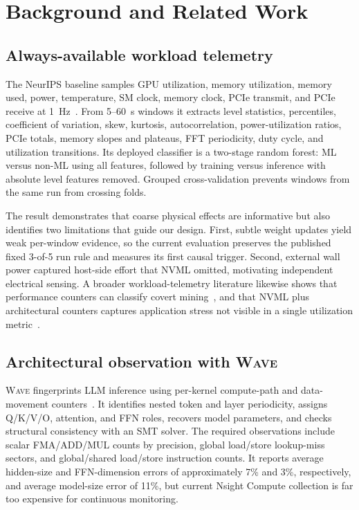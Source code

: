 \documentclass[sigplan,anonymous,review,nonacm]{acmart}
\newcommand{\wave}{\textsc{Wave}}
\begin{document}
\section{Background and Related Work}

\subsection{Always-available workload telemetry}

The NeurIPS baseline samples GPU utilization, memory utilization, memory used, power, temperature, SM clock, memory clock, PCIe transmit, and PCIe receive at 1~Hz~\cite{rahman2026hidden}. From 5--60~s windows it extracts level statistics, percentiles, coefficient of variation, skew, kurtosis, autocorrelation, power-utilization ratios, PCIe totals, memory slopes and plateaus, FFT periodicity, duty cycle, and utilization transitions. Its deployed classifier is a two-stage random forest: ML versus non-ML using all features, followed by training versus inference with absolute level features removed. Grouped cross-validation prevents windows from the same run from crossing folds.

The result demonstrates that coarse physical effects are informative but also identifies two limitations that guide our design. First, subtle weight updates yield weak per-window evidence, so the current evaluation preserves the published fixed 3-of-5 run rule and measures its first causal trigger. Second, external wall power captured host-side effort that NVML omitted, motivating independent electrical sensing. A broader workload-telemetry literature likewise shows that performance counters can classify covert mining~\cite{gangwal2020mining}, and that NVML plus architectural counters captures application stress not visible in a single utilization metric~\cite{esposito2025pressure}.

\subsection{Architectural observation with \wave{}}

\wave{} fingerprints LLM inference using per-kernel compute-path and data-movement counters~\cite{xu2026wave}. It identifies nested token and layer periodicity, assigns Q/K/V/O, attention, and FFN roles, recovers model parameters, and checks structural consistency with an SMT solver. The required observations include scalar FMA/ADD/MUL counts by precision, global load/store lookup-miss sectors, and global/shared load/store instruction counts. It reports average hidden-size and FFN-dimension errors of approximately 7\% and 3\%, respectively, and average model-size error of 11\%, but current Nsight Compute collection is far too expensive for continuous monitoring.
\end{document}
